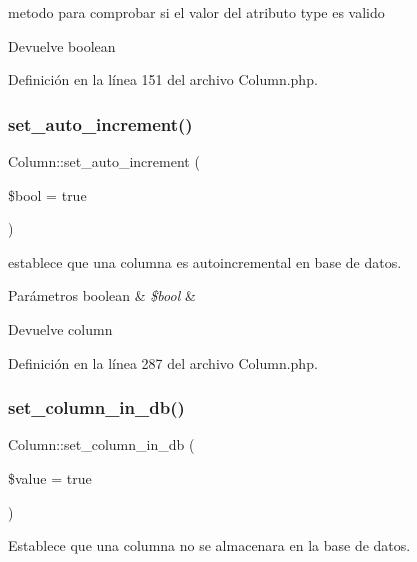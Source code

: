 metodo para comprobar si el valor del atributo type es valido

\begin{DoxyReturn}{Devuelve}
boolean 
\end{DoxyReturn}


Definición en la línea 151 del archivo Column.\+php.

\mbox{\label{class_column_a32c16aaa4042527777de5b48754c3fbd}} 
\subsubsection{\texorpdfstring{set\_auto\_increment()}{set\_auto\_increment()}}
{\footnotesize\ttfamily Column\+::set\+\_\+auto\+\_\+increment (\begin{DoxyParamCaption}\item[{}]{\$bool = {\ttfamily true} }\end{DoxyParamCaption})}

establece que una columna es autoincremental en base de datos.


\begin{DoxyParams}[1]{Parámetros}
boolean & {\em \$bool} & \\
\hline
\end{DoxyParams}
\begin{DoxyReturn}{Devuelve}
column 
\end{DoxyReturn}


Definición en la línea 287 del archivo Column.\+php.

\mbox{\label{class_column_af7dbe1ffea3921f6af03c05ca057e7f2}} 
\subsubsection{\texorpdfstring{set\_column\_in\_db()}{set\_column\_in\_db()}}
{\footnotesize\ttfamily Column\+::set\+\_\+column\+\_\+in\+\_\+db (\begin{DoxyParamCaption}\item[{}]{\$value = {\ttfamily true} }\end{DoxyParamCaption})}

Establece que una columna no se almacenara en la base de datos.


